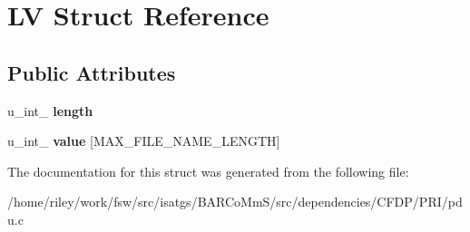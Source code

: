 \hypertarget{struct_l_v}{}\section{LV Struct Reference}
\label{struct_l_v}
\subsection*{Public Attributes}
\begin{DoxyCompactItemize}
\item 
u\+\_\+int\+\_ {\bfseries length}\hypertarget{struct_l_v_aade78150507af2980eb6c8bb6b4321f4}{}\label{struct_l_v_aade78150507af2980eb6c8bb6b4321f4}

\item 
u\+\_\+int\+\_ {\bfseries value} \mbox{[}M\+A\+X\+\_\+\+F\+I\+L\+E\+\_\+\+N\+A\+M\+E\+\_\+\+L\+E\+N\+G\+TH\mbox{]}\hypertarget{struct_l_v_a3e11374d15114b08bd518075a96ec39c}{}\label{struct_l_v_a3e11374d15114b08bd518075a96ec39c}

\end{DoxyCompactItemize}


The documentation for this struct was generated from the following file\+:\begin{DoxyCompactItemize}
\item 
/home/riley/work/fsw/src/isatgs/\+B\+A\+R\+Co\+Mm\+S/src/dependencies/\+C\+F\+D\+P/\+P\+R\+I/pdu.\+c\end{DoxyCompactItemize}
